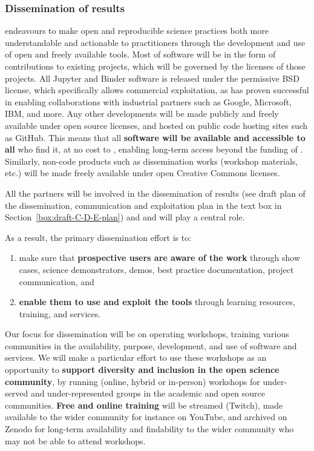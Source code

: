 \subsubsection{Dissemination of results}

 \TheProject endeavours to make open and reproducible science practices both more understandable and actionable
 to practitioners through the development and use of open and freely available tools.
Most of \TheProject software will be in the form of contributions to existing projects,
which will be governed by the licenses of those projects.
All Jupyter and Binder software is released under the permissive BSD license,
which specifically allows commercial exploitation,
as has proven successful in enabling collaborations with industrial partners
such as Google, Microsoft, IBM, and more.
Any other developments will  be made publicly and freely available under open source licenses, and
hosted on public code hosting sites such as GitHub.
This means that all \textbf{\TheProject software will be available and accessible to all} who find it,
at no cost to \TheProject,
enabling long-term access beyond the funding of \TheProject.
Similarly, non-code products such as dissemination works
(workshop materials, etc.) will be made freely available under open Creative Commons licenses.


All the partners will be involved in the dissemination of \TheProject results (see draft plan of the
dissemination, communication and exploitation plan in the text box in Section~\ref{box:draft-C-D-E-plan}) and
 and  will play a central role.

As a result, the primary dissemination effort is to:
\begin{enumerate}
  \item make sure that \textbf{prospective users are aware of the work} through
    {show cases, science demonstrators, demos, best practice
      documentation, project communication}, and
  \item \textbf{enable them to use and exploit the tools} through learning resources, training, and services.
\end{enumerate}

Our focus for dissemination will be on
operating workshops, training various communities in the availability,
purpose, development, and use of \TheProject software and services.
We will make a particular effort to use these workshops as an opportunity
to \textbf{support diversity and inclusion in the open science community},
by running (online, hybrid or in-person) workshops for under-served and under-represented groups in the academic and
open source communities. \textbf{Free and online training} will be streamed (Twitch),
 made available to the wider community for instance on YouTube, and archived on Zenodo for long-term availability and
 findability to the wider community who may not be able to attend workshops.


